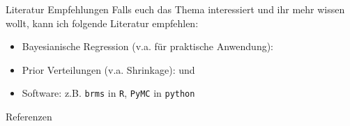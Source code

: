 \documentclass[
  ignorenonframetext,
  aspectratio=169,
]{beamer}
\newif\ifbibliography
\providecommand{\tightlist}{%
  \setlength{\itemsep}{0pt}\setlength{\parskip}{0pt}}
\begin{document}
\begin{frame}[fragile]{Literatur Empfehlungen}
\protect{}\label{literatur-empfehlungen}
Falls euch das Thema interessiert und ihr mehr wissen wollt, kann ich
folgende Literatur empfehlen:

\begin{itemize}
\tightlist
\item
  Bayesianische Regression (v.a. für praktische Anwendung):
  \textcite{gelman_bayesian_2013}
\item
  Prior Verteilungen (v.a. Shrinkage): \textcite{van_erp_shrinkage_2019}
  und \textcite{celeux_regularization_2012}
\item
  Software: z.B. \texttt{brms} in \texttt{R}, \texttt{PyMC} in
  \texttt{python}
\end{itemize}
\end{frame}

\begin{frame}[allowframebreaks]{Referenzen}
  \bibliographytrue
  \printbibliography[heading=none]
\end{frame}
\end{document}
